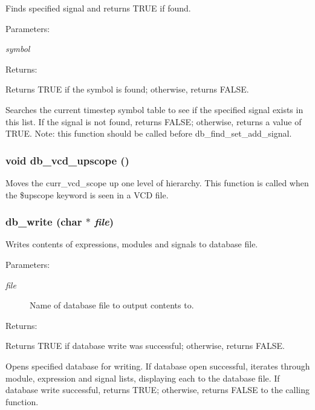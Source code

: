 Finds specified signal and returns TRUE if found.

\begin{Desc}
\item[Parameters: ]\par
\begin{description}
\item[{\em 
symbol}]\end{description}
\end{Desc}
\begin{Desc}
\item[Returns: ]\par
Returns TRUE if the symbol is found; otherwise, returns FALSE.\end{Desc}
Searches the current timestep symbol table to see if the specified signal exists in this list. If the signal is not found, returns FALSE; otherwise, returns a value of TRUE. Note: this function should be called before db\_\-find\_\-set\_\-add\_\-signal. 
\subsubsection{\setlength{\rightskip}{0pt plus 5cm}void db\_\-vcd\_\-upscope ()}\label{db_8c_a29}


Moves the curr\_\-vcd\_\-scope up one level of hierarchy. This function is called when the \$upscope keyword is seen in a VCD file. 
\subsubsection{ db\_\-write (char $\ast$ {\em file})}\label{db_8c_a13}


Writes contents of expressions, modules and signals to database file.

\begin{Desc}
\item[Parameters: ]\par
\begin{description}
\item[{\em 
file}]Name of database file to output contents to.\end{description}
\end{Desc}
\begin{Desc}
\item[Returns: ]\par
Returns TRUE if database write was successful; otherwise, returns FALSE.\end{Desc}
Opens specified database for writing. If database open successful, iterates through module, expression and signal lists, displaying each to the database file. If database write successful, returns TRUE; otherwise, returns FALSE to the calling function. 

